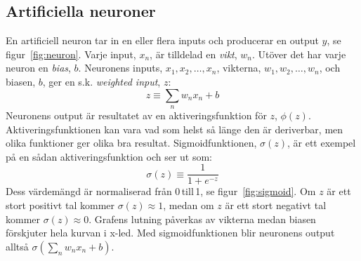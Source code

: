
\subsection{Artificiella neuroner}
\label{sec:neuroner}
\noindent En artificiell neuron tar in en eller flera inputs och producerar
en output $y$, se figur~\ref{fig:neuron}.
Varje input, $x_n$, är tilldelad en \emph{vikt}, $w_n$.
Utöver det har varje neuron en \emph{bias}, $b$.
Neuronens inputs, $x_1,x_2, \dotsc, x_n$, vikterna, $w_1, w_2, \dotsc, w_n$,
och biasen, $b$, ger en s.k. \emph{weighted input}, $z$:
\begin{equation}
	z \equiv \sum_n w_n x_n + b
\end{equation}
Neuronens output är resultatet av en aktiveringsfunktion för $z$, $\phi(z)$.
Aktiveringsfunktionen kan vara vad som helst så länge den är deriverbar,
men olika funktioner ger olika bra resultat.
Sigmoidfunktionen, $\sigma(z)$, är ett exempel på en sådan aktiveringsfunktion
och ser ut som:
\begin{equation}
	\sigma(z) \equiv \frac{1}{1 + e^{-z}}
\end{equation}
Dess värdemängd är normaliserad från 0\,till\,1, se figur~\ref{fig:sigmoid}.
Om $z$ är ett stort positivt tal kommer $ \sigma(z) \approx 1 $,
medan om $z$ är ett stort negativt tal kommer $ \sigma(z) \approx 0 $.
Grafens lutning påverkas av vikterna medan biasen förskjuter hela kurvan i x-led.
Med sigmoidfunktionen blir neuronens output alltså $ \sigma(\sum_n w_n x_n + b) $.
\autocite{nielsen15}


